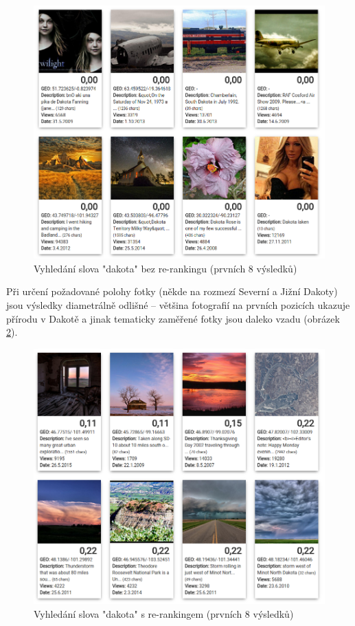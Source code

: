 \documentclass[12pt,oneside,a4paper]{article}
\begin{document}
\begin{figure}[H] \begin{center}
\includegraphics[width=13.5cm]{pics/dakota_no_geo.png} \caption{Vyhledání slova "dakota" bez re-rankingu (prvních 8 výsledků)}
\label{fig:dakota_no_geo}
\end{center} \end{figure}

Při určení požadované polohy fotky (někde na rozmezí Severní a Jižní Dakoty) jsou výsledky diametrálně odlišné -- většina fotografií na prvních pozicích ukazuje přírodu v Dakotě a jinak tematicky zaměřené fotky jsou daleko vzadu (obrázek \ref{fig:dakota_geo}).

\begin{figure} \begin{center}
\includegraphics[width=13.5cm]{pics/dakota_geo.png} \caption{Vyhledání slova "dakota" s re-rankingem (prvních 8 výsledků)}
\label{fig:dakota_geo}
\end{center} \end{figure}
\end{document}
